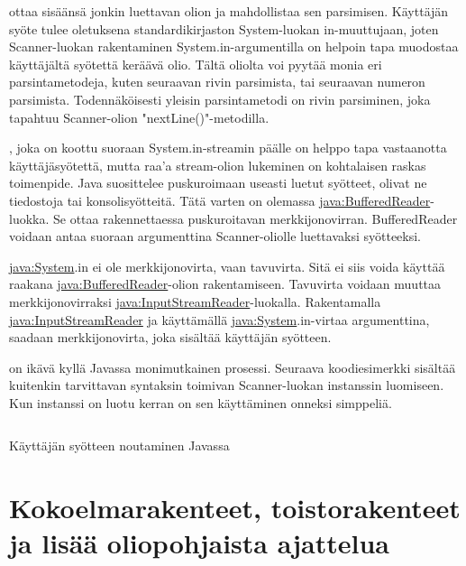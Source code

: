 \documentclass{tufte-book}
\newcommand{\java}[1]{\underline{\gls{java:#1}}}
\newcommand{\code}[3]{
\begin{listing}
    \inputminted{java}{OhjelmointiopasEsimerkit/src/#1/#2.java}
    \caption{#3}
    \label{Java-#1-#2}
\end{listing}
}
\begin{document}
\newthought{\java{Scanner}-luokka} ottaa sisäänsä jonkin luettavan olion ja mahdollistaa sen
parsimisen. Käyttäjän syöte tulee oletuksena standardikirjaston System-luokan in-muuttujaan,
joten Scanner-luokan rakentaminen System.in-argumentilla on helpoin tapa muodostaa käyttäjältä
syötettä keräävä olio. Tältä oliolta voi pyytää monia eri parsintametodeja, kuten seuraavan rivin
parsimista, tai seuraavan numeron parsimista. Todennäköisesti yleisin parsintametodi on rivin
parsiminen, joka tapahtuu Scanner-olion "nextLine()"-metodilla.

\newthought{\java{Scanner}}, joka on koottu suoraan System.in-streamin
päälle on helppo tapa vastaanotta käyttäjäsyötettä, mutta raa'a stream-olion lukeminen on
kohtalaisen raskas toimenpide. Java suosittelee puskuroimaan useasti luetut syötteet, olivat ne
tiedostoja tai konsolisyötteitä. Tätä varten on olemassa \java{BufferedReader}-luokka. Se ottaa
rakennettaessa puskuroitavan merkkijonovirran. BufferedReader voidaan antaa suoraan argumenttina
Scanner-oliolle luettavaksi syötteeksi.

 \java{System}.in ei ole merkkijonovirta, vaan tavuvirta. Sitä ei siis
voida käyttää raakana \java{BufferedReader}-olion rakentamiseen. Tavuvirta voidaan muuttaa
merkkijonovirraksi \java{InputStreamReader}-luokalla. Rakentamalla \java{InputStreamReader}
ja käyttämällä \java{System}.in-virtaa argumenttina, saadaan merkkijonovirta, joka sisältää
käyttäjän syötteen.

 on ikävä kyllä Javassa monimutkainen prosessi. Seuraava
koodiesimerkki sisältää kuitenkin tarvittavan syntaksin toimivan Scanner-luokan instanssin
luomiseen. Kun instanssi on luotu kerran on sen käyttäminen onneksi simppeliä.

\code{week2/basicexamples}{UserInput}{Käyttäjän syötteen noutaminen Javassa}


\chapter{Kokoelmarakenteet, toistorakenteet ja lisää oliopohjaista ajattelua}
\label{perusteet2}

\end{document}
